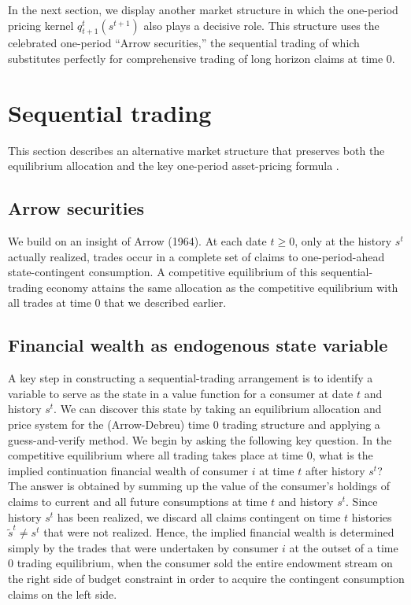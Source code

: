 In the next section, we display  another market structure in which
  the one-period pricing kernel $q^t_{t+1}(s^{t+1})$    also plays
a decisive role.  This structure uses the
celebrated one-period ``Arrow  securities,'' the sequential
trading of which  substitutes perfectly for  comprehensive trading
of long horizon claims at  time $0$.


\section{Sequential trading}\label{sec:arrowsecurities}%
This section describes an alternative
market structure that preserves both the  equilibrium  allocation
 and the  key one-period asset-pricing formula
.



\subsection{Arrow securities}
We build on an insight of Arrow (1964).
At
each date  $t \geq 0$,  only at the history $s^t$ actually realized,  trades occur in a complete set of claims   to
one-period-ahead state-contingent consumption. A
competitive equilibrium of this sequential-trading economy
  attains the same allocation
as the competitive  equilibrium with all trades at time $0$ that we described earlier.



\subsection{Financial wealth as  endogenous state variable}
A key step in constructing a sequential-trading arrangement is to
identify a variable to serve as the state in a value function for
a consumer at date $t$ and history $s^t$. We can discover this state by taking an
equilibrium allocation and price system for the (Arrow-Debreu)
time $0$ trading structure and applying a guess-and-verify method.
We begin by asking the following key question. In the competitive
equilibrium where all trading takes place at time $0$, what is the implied continuation financial wealth of consumer $i$ at time $t$ after history $s^t$?
The answer is obtained by summing up the value of the consumer's
holdings of claims to current and all future consumptions at  time $t$ and
history $s^t$. Since history $s^t$ has been realized, we discard all
claims contingent on time $t$ histories $\tilde s^t \neq s^t$ that
were not realized. Hence, the implied financial wealth is  determined simply
by the trades that were undertaken by consumer $i$ at the outset of a
time $0$ trading equilibrium, when the consumer  sold  the entire endowment stream on the right side of budget
constraint  in order to acquire the contingent consumption claims
on the left side.

